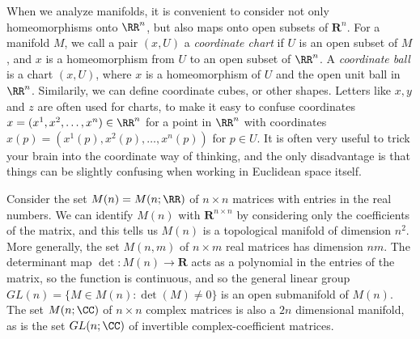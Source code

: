 When we analyze manifolds, it is convenient to consider not only homeomorphisms onto $\RR^n$, but also maps onto open subsets of $\mathbf{R}^n$. For a manifold $M$, we call a pair $(x,U)$ a \emph{coordinate chart} if $U$ is an open subset of $M$, and $x$ is a homeomorphism from $U$ to an open subset of $\RR^n$. A \emph{coordinate ball} is a chart $(x,U)$, where $x$ is a homeomorphism of $U$ and the open unit ball in $\RR^n$. Similarily, we can define coordinate cubes, or other shapes. Letters like $x,y$ and $z$ are often used for charts, to make it easy to confuse coordinates $x = (x^1,x^2, \dots, x^n) \in \RR^n$ for a point in $\RR^n$ with coordinates $x(p) = (x^1(p), x^2(p), \dots, x^n(p))$ for $p \in U$. It is often very useful to trick your brain into the coordinate way of thinking, and the only disadvantage is that things can be slightly confusing when working in Euclidean space itself.

\begin{example}
    Consider the set $M(n) = M(n;\RR)$ of $n \times n$ matrices with entries in the real numbers. We can identify $M(n)$ with $\mathbf{R}^{n \times n}$ by considering only the coefficients of the matrix, and this tells us $M(n)$ is a topological manifold of dimension $n^2$. More generally, the set $M(n,m)$ of $n \times m$ real matrices has dimension $nm$. The determinant map $\det: M(n) \to \mathbf{R}$ acts as a polynomial in the entries of the matrix, so the function is continuous, and so the general linear group $GL(n) = \{ M \in M(n) : \det(M) \neq 0 \}$ is an open submanifold of $M(n)$. The set $M(n;\CC)$ of $n \times n$ complex matrices is also a $2n$ dimensional manifold, as is the set $GL(n;\CC)$ of invertible complex-coefficient matrices.
\end{example}

